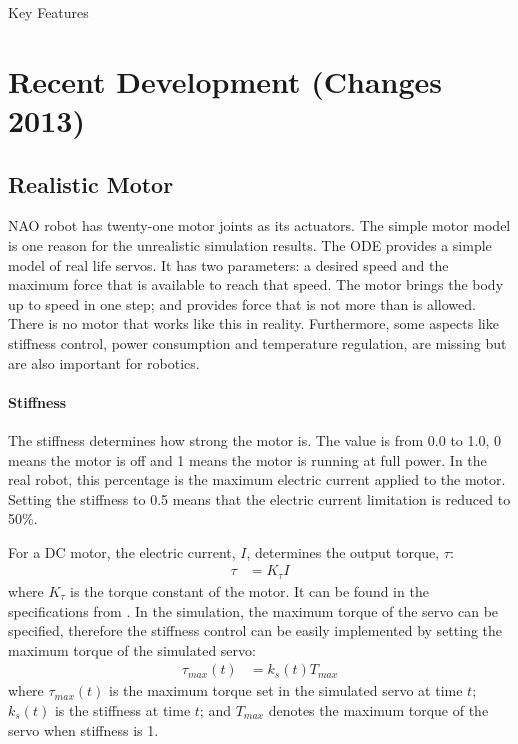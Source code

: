 \documentclass{llncs}
\begin{document}
Key Features

\section{Recent Development (Changes 2013)}


\subsection{Realistic Motor}
NAO robot has twenty-one motor joints as its actuators.
The simple motor model is one reason for the unrealistic simulation results.
The ODE provides a simple model of real life servos.
It has two parameters: a desired speed and the maximum force that is available to reach that speed. The motor brings the body up to speed in one step; and provides force that is not more than is allowed.
There is no motor that works like this in reality.
Furthermore, some aspects like stiffness control, power consumption and temperature regulation, are missing but are also important for robotics.

\paragraph{Stiffness}
The stiffness determines how strong the motor is. The value is from 0.0
to 1.0, 0 means the motor is off and 1 means the motor is running at
full power. In the real robot,
this percentage is the maximum electric current applied to the motor. Setting the
stiffness to 0.5 means that the electric current limitation is reduced
to 50\%.

For a DC motor, the electric current, $I$, determines the output torque,
$\tau$:
\begin{align}
  \tau &= K_\tau I \label{eq:tau-i}
\end{align}
where $K_\tau$ is the torque constant of the motor. It can be found in the
specifications from \cite{naoqi}. In
the simulation, the maximum torque of the servo can be specified, therefore the
stiffness control can be easily implemented by setting the maximum torque
of the simulated servo:
\begin{align}
  \tau_{max}(t) &= k_{s}(t) T_{max}
\end{align}
where $\tau_{max}(t)$ is the maximum torque set in the simulated servo at
time $t$; $k_{s}(t)$ is the stiffness at time $t$; and $T_{max}$
denotes the maximum torque of the servo when stiffness is 1.
\end{document}
